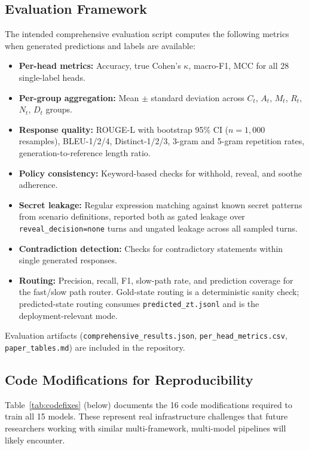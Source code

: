 \documentclass[11pt]{article}
\begin{document}
\subsection{Evaluation Framework}

The intended comprehensive evaluation script computes the following metrics when generated predictions and labels are available:

\begin{itemize}
    \item \textbf{Per-head metrics:} Accuracy, true Cohen's $\kappa$, macro-F1, MCC for all 28 single-label heads.
    \item \textbf{Per-group aggregation:} Mean $\pm$ standard deviation across $C_t$, $A_t$, $M_t$, $R_t$, $N_t$, $D_t$ groups.
    \item \textbf{Response quality:} ROUGE-L with bootstrap 95\% CI ($n=1{,}000$ resamples), BLEU-1/2/4, Distinct-1/2/3, 3-gram and 5-gram repetition rates, generation-to-reference length ratio.
    \item \textbf{Policy consistency:} Keyword-based checks for withhold, reveal, and soothe adherence.
    \item \textbf{Secret leakage:} Regular expression matching against known secret patterns from scenario definitions, reported both as gated leakage over \texttt{reveal\_decision=none} turns and ungated leakage across all sampled turns.
    \item \textbf{Contradiction detection:} Checks for contradictory statements within single generated responses.
    \item \textbf{Routing:} Precision, recall, F1, slow-path rate, and prediction coverage for the fast/slow path router. Gold-state routing is a deterministic sanity check; predicted-state routing consumes \texttt{predicted\_zt.jsonl} and is the deployment-relevant mode.
\end{itemize}

Evaluation artifacts (\texttt{comprehensive\_results.json}, \texttt{per\_head\_metrics.csv}, \texttt{paper\_tables.md}) are included in the repository.

\subsection{Code Modifications for Reproducibility}

Table~\ref{tab:codefixes} (below) documents the 16 code modifications required to train all 15 models.
These represent real infrastructure challenges that future researchers working with similar multi-framework, multi-model pipelines will likely encounter.
\end{document}
